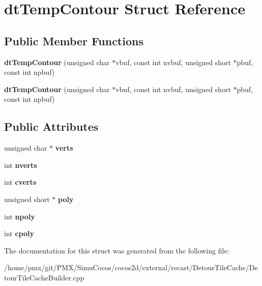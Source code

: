 \hypertarget{structdtTempContour}{}\section{dt\+Temp\+Contour Struct Reference}
\label{structdtTempContour}
\subsection*{Public Member Functions}
\begin{DoxyCompactItemize}
\item 
\mbox{\label{structdtTempContour_a7bc7026b48e8a23448e6fe5363c7e20f}} 
{\bfseries dt\+Temp\+Contour} (unsigned char $\ast$vbuf, const int nvbuf, unsigned short $\ast$pbuf, const int npbuf)
\item 
\mbox{\label{structdtTempContour_a7bc7026b48e8a23448e6fe5363c7e20f}} 
{\bfseries dt\+Temp\+Contour} (unsigned char $\ast$vbuf, const int nvbuf, unsigned short $\ast$pbuf, const int npbuf)
\end{DoxyCompactItemize}
\subsection*{Public Attributes}
\begin{DoxyCompactItemize}
\item 
\mbox{\label{structdtTempContour_a7092fee71133bc70e09748d4137d2a8f}} 
unsigned char $\ast$ {\bfseries verts}
\item 
\mbox{\label{structdtTempContour_ab01c00d6a0d27fa0fb88743030e7a303}} 
int {\bfseries nverts}
\item 
\mbox{\label{structdtTempContour_af7144f4b212231221298f01f47e461d3}} 
int {\bfseries cverts}
\item 
\mbox{\label{structdtTempContour_a34472eb18c37a9b1ee357c9d55689524}} 
unsigned short $\ast$ {\bfseries poly}
\item 
\mbox{\label{structdtTempContour_a6dd3c29881b08d88182c1a6117132879}} 
int {\bfseries npoly}
\item 
\mbox{\label{structdtTempContour_a0d3c890707733eb165076c44202b9058}} 
int {\bfseries cpoly}
\end{DoxyCompactItemize}


The documentation for this struct was generated from the following file\+:\begin{DoxyCompactItemize}
\item 
/home/pmx/git/\+P\+M\+X/\+Simu\+Cocos/cocos2d/external/recast/\+Detour\+Tile\+Cache/Detour\+Tile\+Cache\+Builder.\+cpp\end{DoxyCompactItemize}
